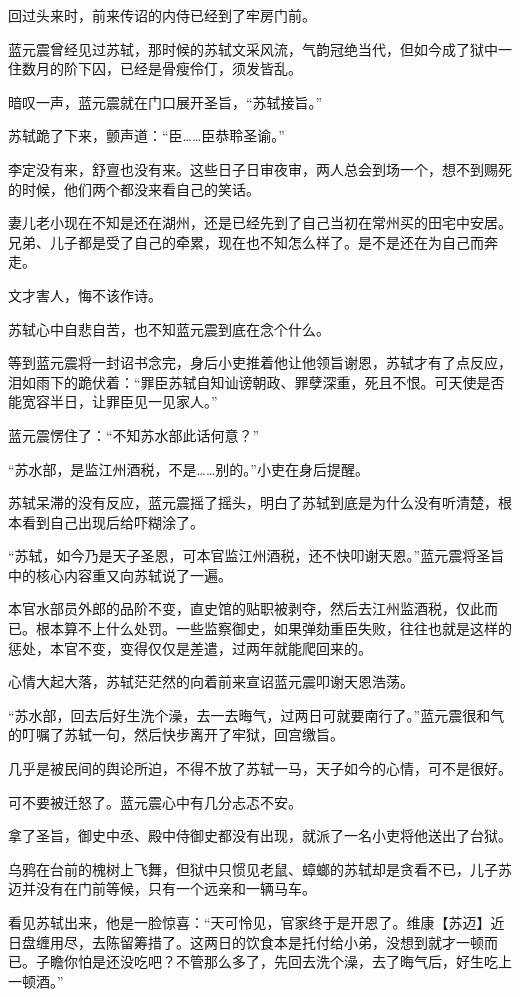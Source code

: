 回过头来时，前来传诏的内侍已经到了牢房门前。

蓝元震曾经见过苏轼，那时候的苏轼文采风流，气韵冠绝当代，但如今成了狱中一住数月的阶下囚，已经是骨瘦伶仃，须发皆乱。

暗叹一声，蓝元震就在门口展开圣旨，“苏轼接旨。”

苏轼跪了下来，颤声道：“臣……臣恭聆圣谕。”

李定没有来，舒亶也没有来。这些日子日审夜审，两人总会到场一个，想不到赐死的时候，他们两个都没来看自己的笑话。

妻儿老小现在不知是还在湖州，还是已经先到了自己当初在常州买的田宅中安居。兄弟、儿子都是受了自己的牵累，现在也不知怎么样了。是不是还在为自己而奔走。

文才害人，悔不该作诗。

苏轼心中自悲自苦，也不知蓝元震到底在念个什么。

等到蓝元震将一封诏书念完，身后小吏推着他让他领旨谢恩，苏轼才有了点反应，泪如雨下的跪伏着：“罪臣苏轼自知讪谤朝政、罪孽深重，死且不恨。可天使是否能宽容半日，让罪臣见一见家人。”

蓝元震愣住了：“不知苏水部此话何意？”

“苏水部，是监江州酒税，不是……别的。”小吏在身后提醒。

苏轼呆滞的没有反应，蓝元震摇了摇头，明白了苏轼到底是为什么没有听清楚，根本看到自己出现后给吓糊涂了。

“苏轼，如今乃是天子圣恩，可本官监江州酒税，还不快叩谢天恩。”蓝元震将圣旨中的核心内容重又向苏轼说了一遍。

本官水部员外郎的品阶不变，直史馆的贴职被剥夺，然后去江州监酒税，仅此而已。根本算不上什么处罚。一些监察御史，如果弹劾重臣失败，往往也就是这样的惩处，本官不变，变得仅仅是差遣，过两年就能爬回来的。

心情大起大落，苏轼茫茫然的向着前来宣诏蓝元震叩谢天恩浩荡。

“苏水部，回去后好生洗个澡，去一去晦气，过两日可就要南行了。”蓝元震很和气的叮嘱了苏轼一句，然后快步离开了牢狱，回宫缴旨。

几乎是被民间的舆论所迫，不得不放了苏轼一马，天子如今的心情，可不是很好。

可不要被迁怒了。蓝元震心中有几分忐忑不安。

拿了圣旨，御史中丞、殿中侍御史都没有出现，就派了一名小吏将他送出了台狱。

乌鸦在台前的槐树上飞舞，但狱中只惯见老鼠、蟑螂的苏轼却是贪看不已，儿子苏迈并没有在门前等候，只有一个远亲和一辆马车。

看见苏轼出来，他是一脸惊喜：“天可怜见，官家终于是开恩了。维康【苏迈】近日盘缠用尽，去陈留筹措了。这两日的饮食本是托付给小弟，没想到就才一顿而已。子瞻你怕是还没吃吧？不管那么多了，先回去洗个澡，去了晦气后，好生吃上一顿酒。”

